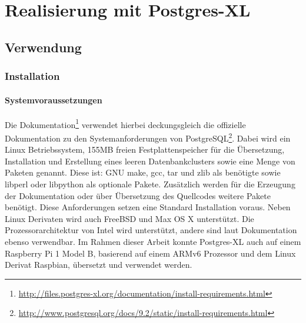 \chapter{Realisierung mit Postgres-XL}
\label{chapter:postgresxl}

\section{Verwendung}

\subsection{Installation}
\subsubsection{Systemvoraussetzungen}
Die Dokumentation\footnote{\url{http://files.postgres-xl.org/documentation/install-requirements.html}} verwendet hierbei deckungsgleich die offizielle Dokumentation zu den Systemanforderungen von PostgreSQL\footnote{\url{http://www.postgresql.org/docs/9.2/static/install-requirements.html}}.
Dabei wird ein Linux Betriebssystem, 155MB freien Festplattenspeicher für die Übersetzung, Installation und Erstellung eines leeren Datenbankclusters sowie eine Menge von Paketen genannt.
Diese ist: GNU make, gcc, tar und zlib als benötigte sowie libperl oder libpython als optionale Pakete.
Zusätzlich werden für die Erzeugung der Dokumentation oder über Übersetzung des Quellcodes weitere Pakete benötigt.
Diese Anforderungen setzen eine Standard Installation voraus.
Neben Linux Derivaten wird auch FreeBSD und Max OS X unterstützt.
Die Prozessorarchitektur von Intel wird unterstützt, andere sind laut Dokumentation ebenso verwendbar.
Im Rahmen dieser Arbeit konnte Postgres-XL auch auf einem Raspberry Pi 1 Model B, basierend auf einem ARMv6 Prozessor und dem Linux Derivat Raspbian, übersetzt und verwendet werden.

